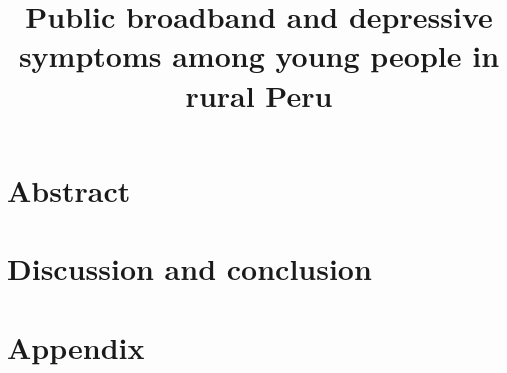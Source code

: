 \usepackage[T1]{fontenc}
\usepackage{lmodern}
\usepackage[margin=1in]{geometry}
\usepackage{graphicx,booktabs}
\usepackage[authoryear,round]{natbib}
\usepackage[hidelinks]{hyperref}
\linespread{1.2}
\title{Public broadband and depressive symptoms among young people in rural Peru}
\author{}
\date{}

\maketitle
\thispagestyle{empty}

\section*{Abstract}






\section{Discussion and conclusion}

% 
% 

\appendix
\section*{Appendix}

